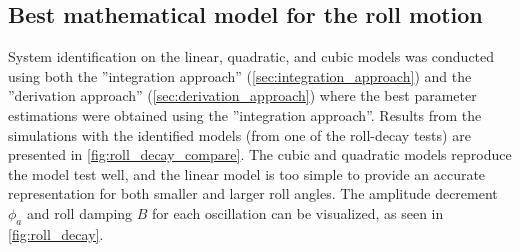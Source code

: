 \subsection{Best mathematical model for the roll motion}
System identification on the linear, quadratic, and cubic models was conducted using both the ''integration approach'' (\autoref{sec:integration_approach}) and the ''derivation approach'' (\autoref{sec:derivation_approach}) where the best parameter estimations were obtained using the ''integration approach''.
Results from the simulations with the identified models (from one of the roll-decay tests) are presented in \autoref{fig:roll_decay_compare}. The cubic and quadratic models reproduce the model test well, and the linear model is too simple to provide an accurate representation for both smaller and larger roll angles. The amplitude decrement $\phi_a$ and roll damping $B$ for each oscillation can be visualized, as seen in \autoref{fig:roll_decay}.


